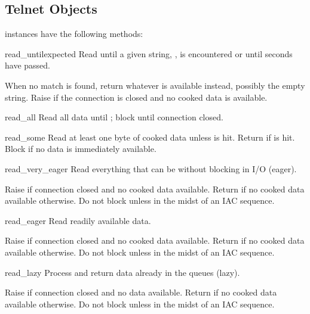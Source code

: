 \subsection{Telnet Objects \label{telnet-objects}}

 instances have the following methods:


\begin{methoddesc}{read_until}{expected}
Read until a given string, , is encountered or until
 seconds have passed.

When no match is found, return whatever is available instead,
possibly the empty string.  Raise  if the connection
is closed and no cooked data is available.
\end{methoddesc}

\begin{methoddesc}{read_all}{}
Read all data until \EOF; block until connection closed.
\end{methoddesc}

\begin{methoddesc}{read_some}{}
Read at least one byte of cooked data unless \EOF{} is hit.
Return  if \EOF{} is hit.  Block if no data is immediately
available.
\end{methoddesc}

\begin{methoddesc}{read_very_eager}{}
Read everything that can be without blocking in I/O (eager).

Raise  if connection closed and no cooked data
available.  Return  if no cooked data available otherwise.
Do not block unless in the midst of an IAC sequence.
\end{methoddesc}

\begin{methoddesc}{read_eager}{}
Read readily available data.

Raise  if connection closed and no cooked data
available.  Return  if no cooked data available otherwise.
Do not block unless in the midst of an IAC sequence.
\end{methoddesc}

\begin{methoddesc}{read_lazy}{}
Process and return data already in the queues (lazy).

Raise  if connection closed and no data available.
Return  if no cooked data available otherwise.  Do not block
unless in the midst of an IAC sequence.
\end{methoddesc}

